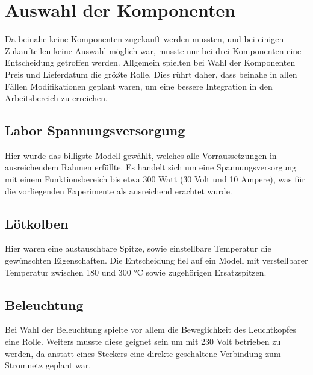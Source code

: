 \section{Auswahl der Komponenten}

Da beinahe keine Komponenten zugekauft werden mussten, und bei einigen Zukaufteilen keine Auswahl möglich war, musste nur bei drei Komponenten eine Entscheidung getroffen werden.
Allgemein spielten bei Wahl der Komponenten Preis und Lieferdatum die größte Rolle.
Dies rührt daher, dass beinahe in allen Fällen Modifikationen geplant waren, um eine bessere Integration in den Arbeitsbereich zu erreichen.

\subsection{Labor Spannungsversorgung}

Hier wurde das billigste Modell gewählt, welches alle Vorraussetzungen in ausreichendem Rahmen erfüllte.
Es handelt sich um eine Spannungsversorgung mit einem Funktionsbereich bis etwa 300 Watt (30 Volt und 10 Ampere), was für die vorliegenden Experimente als ausreichend erachtet wurde.


\subsection{Lötkolben}

Hier waren eine austauschbare Spitze, sowie einstellbare Temperatur die gewünschten Eigenschaften.
Die Entscheidung fiel auf ein Modell mit verstellbarer Temperatur zwischen 180 und 300 °C sowie zugehörigen Ersatzspitzen.


\subsection{Beleuchtung}

Bei Wahl der Beleuchtung spielte vor allem die Beweglichkeit des Leuchtkopfes eine Rolle. 
Weiters musste diese geignet sein um mit 230 Volt betrieben zu werden, da anstatt eines Steckers eine direkte geschaltene Verbindung zum Stromnetz geplant war.

